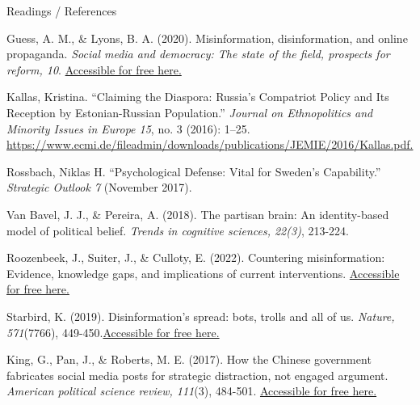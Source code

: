 \documentclass[nobackground,dvipsnames,table]{beamer}
\begin{document}
\begin{frame}{Readings / References}

\begin{enumerate}
\scriptsize{
    \item Guess, A. M., \& Lyons, B. A. (2020). Misinformation, disinformation, and online propaganda. \emph{Social media and democracy: The state of the field, prospects for reform, 10}. \href{https://www.cambridge.org/core/books/social-media-and-democracy/E79E2BBF03C18C3A56A5CC393698F117}{Accessible for free here.}
    \item Kallas, Kristina. “Claiming the Diaspora: Russia’s Compatriot Policy and Its Reception by Estonian-Russian Population.” \emph{Journal on Ethnopolitics and Minority Issues in Europe 15}, no. 3 (2016): 1–25. \href{https://www.ecmi.de/fileadmin/downloads/publications/JEMIE/2016/Kallas.pdf}{https://www.ecmi.de/fileadmin/downloads/publications/JEMIE/2016/Kallas.pdf.}
    \item Rossbach, Niklas H. “Psychological Defense:  Vital for Sweden’s Capability.” \emph{Strategic Outlook 7} (November 2017). 
    \item Van Bavel, J. J., \& Pereira, A. (2018). The partisan brain: An identity-based model of political belief. \emph{Trends in cognitive sciences, 22(3)}, 213-224.
    \item Roozenbeek, J., Suiter, J., \& Culloty, E. (2022). Countering misinformation: Evidence, knowledge gaps, and implications of current interventions. \href{https://psyarxiv.com/b52um}{Accessible for free here.}
    \item Starbird, K. (2019). Disinformation's spread: bots, trolls and all of us. \emph{Nature, 571}(7766), 449-450.\href{https://www.nature.com/articles/d41586-019-02235-x}{Accessible for free here.} 
    \item King, G., Pan, J., \& Roberts, M. E. (2017). How the Chinese government fabricates social media posts for strategic distraction, not engaged argument. \emph{American political science review, 111}(3), 484-501. \href{https://www.cambridge.org/core/services/aop-cambridge-core/content/view/4662DB26E2685BAF1485F14369BD137C/S0003055417000144a.pdf/how-the-chinese-government-fabricates-social-media-posts-for-strategic-distraction-not-engaged-argument.pdf}{Accessible for free here.}
    }
\end{enumerate}
    
\end{frame}

\end{document}
